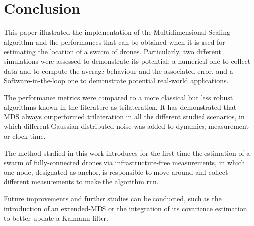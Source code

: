 \section{Conclusion}\label{sec:conclusion_section}
This paper illustrated the implementation of the Multidimensional Scaling algorithm and the performances that can be obtained when it is used for estimating the location of a swarm of drones. Particularly, two different simulations were assessed to demonstrate its potential: a numerical one to collect data and to compute the average behaviour and the associated error, and a Software-in-the-loop one to demonstrate potential real-world applications. \par

The performance metrics were compared to a more classical but less robust algorithms known in the literature as trilateration. It has demonstrated that MDS always outperformed trilateration in all the different studied scenarios, in which different Gaussian-distributed noise was added to dynamics, measurement or clock-time. \par

The method studied in this work introduces for the first time the estimation of a swarm of fully-connected drones via infrastructure-free measurements, in which one node, designated as anchor, is responsible to move around and collect different measurements to make the algorithm run. \par

Future improvements and further studies can be conducted, such as the introduction of an extended-MDS or the integration of its covariance estimation to better update a Kalmann filter.